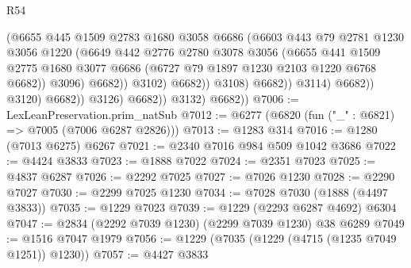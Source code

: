 \begin{lexlean}{R54}
\begin{coremodule}
                                        (@6655
                                          @445
                                          @1509
                                          @2783
                                          @1680
                                          @3058
                                          @6686
                                          (@6603
                                            @443
                                            @79
                                            @2781
                                            @1230
                                            @3056
                                            @1220
                                            (@6649
                                              @442
                                              @2776
                                              @2780
                                              @3078
                                              @3056
                                              (@6655
                                                @441
                                                @1509
                                                @2775
                                                @1680
                                                @3077
                                                @6686
                                                (@6727 @79 @1897 @1230 @2103 @1220 @6768 @6682))
                                              @3096)
                                            @6682))
                                        @3102)
                                      @6682))
                                  @3108)
                                @6682))
                            @3114)
                          @6682))
                      @3120)
                    @6682))
                @3126)
              @6682))
          @3132)
        @6682))
@7006 := LexLeanPreservation.prim_natSub
@7012 := @6277 (@6820 (fun ("_" : @6821) => @7005 (@7006 @6287 @2826)))
@7013 := @1283 @314
@7016 := @1280 (@7013 @6275) @6267
@7021 := @2340 @7016 @984 @509 @1042 @3686
@7022 := @4424 @3833
@7023 := @1888 @7022
@7024 := @2351 @7023
@7025 := @4837 @6287
@7026 := @2292 @7025
@7027 := @7026 @1230
@7028 := @2290 @7027
@7030 := @2299 @7025 @1230
@7034 := @7028 @7030 (@1888 (@4497 @3833))
@7035 := @1229 @7023
@7039 := @1229 (@2293 @6287 @4692) @6304
@7047 := @2834 (@2292 @7039 @1230) (@2299 @7039 @1230) @38 @6289
@7049 := @1516 @7047 @1979
@7056 := @1229 (@7035 (@1229 (@4715 (@1235 @7049 @1251)) @1230))
@7057 := @4427 @3833

\end{coremodule}
\end{lexlean}
